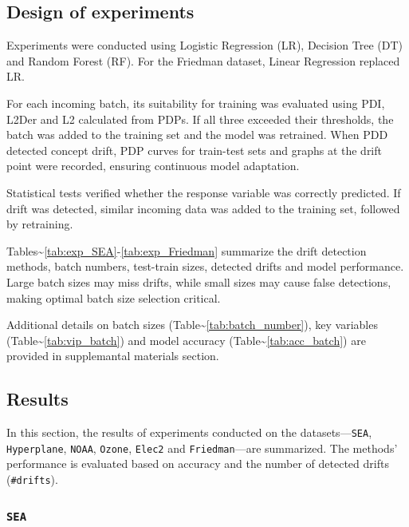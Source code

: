 \hypertarget{design-of-experiments}{%
\subsection{Design of experiments}\label{design-of-experiments}}

Experiments were conducted using Logistic Regression (LR), Decision Tree (DT) and Random Forest (RF). For the Friedman dataset, Linear Regression replaced LR.

For each incoming batch, its suitability for training was evaluated using PDI, L2Der and L2 calculated from PDPs. If all three exceeded their thresholds, the batch was added to the training set and the model was retrained. When PDD detected concept drift, PDP curves for train-test sets and graphs at the drift point were recorded, ensuring continuous model adaptation.

Statistical tests verified whether the response variable was correctly predicted. If drift was detected, similar incoming data was added to the training set, followed by retraining.

Tables\textasciitilde{}\ref{tab:exp_SEA}-\ref{tab:exp_Friedman} summarize the drift detection methods, batch numbers, test-train sizes, detected drifts and model performance. Large batch sizes may miss drifts, while small sizes may cause false detections, making optimal batch size selection critical.

Additional details on batch sizes (Table\textasciitilde{}\ref{tab:batch_number}), key variables (Table\textasciitilde{}\ref{tab:vip_batch}) and model accuracy (Table\textasciitilde{}\ref{tab:acc_batch}) are provided in supplemantal materials section.

\hypertarget{results}{%
\subsection{Results}\label{results}}

In this section, the results of experiments conducted on the datasets---\texttt{SEA}, \texttt{Hyperplane}, \texttt{NOAA}, \texttt{Ozone}, \texttt{Elec2} and \texttt{Friedman}---are summarized. The methods' performance is evaluated based on accuracy and the number of detected drifts (\texttt{\#drifts}).

\hypertarget{section}{%
\subsubsection{\texorpdfstring{\texttt{SEA}}{}}\label{section}}

